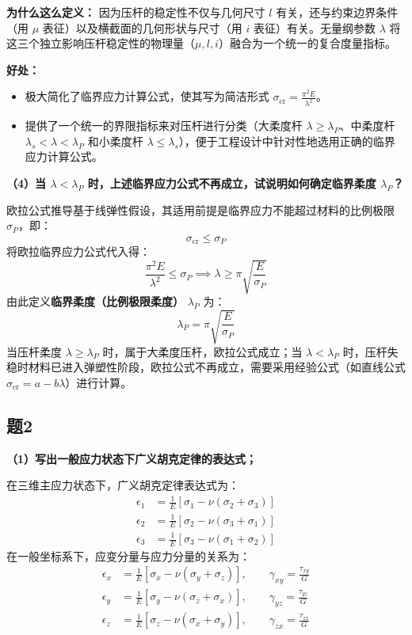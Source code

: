 \documentclass[UTF8,fontset=windows]{ctexart}
\begin{document}
\textbf{为什么这么定义：}
因为压杆的稳定性不仅与几何尺寸 $l$ 有关，还与约束边界条件（用 $\mu$ 表征）以及横截面的几何形状与尺寸（用 $i$ 表征）有关。无量纲参数 $\lambda$ 将这三个独立影响压杆稳定性的物理量（$\mu, l, i$）融合为一个统一的复合度量指标。

\textbf{好处：}
\begin{itemize}
    \item 极大简化了临界应力计算公式，使其写为简洁形式 $\sigma_{\text{cr}} = \frac{\pi^2 E}{\lambda^2}$。
    \item 提供了一个统一的界限指标来对压杆进行分类（大柔度杆 $\lambda \ge \lambda_P$、中柔度杆 $\lambda_s < \lambda < \lambda_P$ 和小柔度杆 $\lambda \le \lambda_s$），便于工程设计中针对性地选用正确的临界应力计算公式。
\end{itemize}

\textbf{（4）当 $\lambda < \lambda_P$ 时，上述临界应力公式不再成立，试说明如何确定临界柔度 $\lambda_P$？}

欧拉公式推导基于线弹性假设，其适用前提是临界应力不能超过材料的比例极限 $\sigma_P$，即：
\[
    \sigma_{\text{cr}} \le \sigma_P
\]
将欧拉临界应力公式代入得：
\[
    \frac{\pi^2 E}{\lambda^2} \le \sigma_P \implies \lambda \ge \pi \sqrt{\frac{E}{\sigma_P}}
\]
由此定义\textbf{临界柔度（比例极限柔度）} $\lambda_P$ 为：
\[
    \lambda_P = \pi \sqrt{\frac{E}{\sigma_P}}
\]
当压杆柔度 $\lambda \ge \lambda_P$ 时，属于大柔度压杆，欧拉公式成立；当 $\lambda < \lambda_P$ 时，压杆失稳时材料已进入弹塑性阶段，欧拉公式不再成立，需要采用经验公式（如直线公式 $\sigma_{\text{cr}} = a - b\lambda$）进行计算。

\subsection*{题2}
\textbf{（1）写出一般应力状态下广义胡克定律的表达式；}

在三维主应力状态下，广义胡克定律表达式为：
\[
    \begin{aligned}
        \epsilon_1 &= \frac{1}{E} \left[ \sigma_1 - \nu (\sigma_2 + \sigma_3) \right] \\
        \epsilon_2 &= \frac{1}{E} \left[ \sigma_2 - \nu (\sigma_3 + \sigma_1) \right] \\
        \epsilon_3 &= \frac{1}{E} \left[ \sigma_3 - \nu (\sigma_1 + \sigma_2) \right]
    \end{aligned}
\]
在一般坐标系下，应变分量与应力分量的关系为：
\[
    \begin{aligned}
        \epsilon_x &= \frac{1}{E} \left[ \sigma_x - \nu (\sigma_y + \sigma_z) \right], \qquad \gamma_{xy} = \frac{\tau_{xy}}{G} \\
        \epsilon_y &= \frac{1}{E} \left[ \sigma_y - \nu (\sigma_z + \sigma_x) \right], \qquad \gamma_{yz} = \frac{\tau_{yz}}{G} \\
        \epsilon_z &= \frac{1}{E} \left[ \sigma_z - \nu (\sigma_x + \sigma_y) \right], \qquad \gamma_{zx} = \frac{\tau_{zx}}{G}
    \end{aligned}
\]
\end{document}
